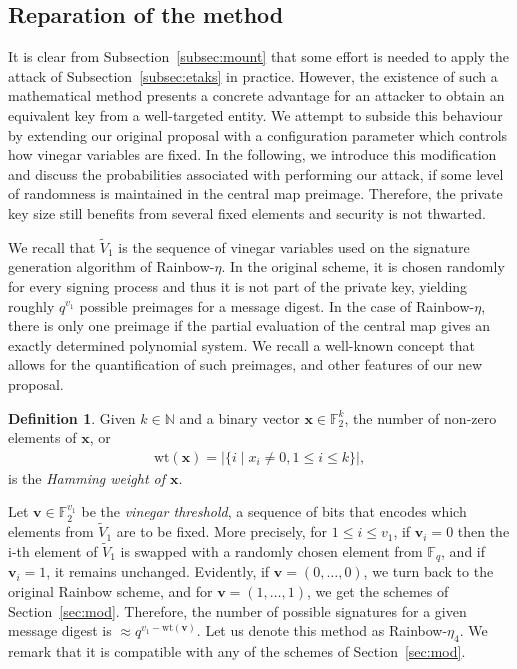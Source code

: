 \documentclass[12pt, a4paper, oneside]{memoir}
\theoremstyle{definition}
\newtheorem{definition}[theorem]{Definition}
\begin{document}
\subsection{Reparation of the method}\label{subsec:repair}

It is clear from Subsection~\ref{subsec:mount} that some effort is needed to apply the attack of Subsection~\ref{subsec:etaks} in practice. However, the existence of such a mathematical method presents a concrete advantage for an attacker to obtain an equivalent key from a well-targeted entity. We attempt to subside this behaviour by extending our original proposal with a configuration parameter which controls how vinegar variables are fixed. In the following, we introduce this modification and discuss the probabilities associated with performing our attack, if some level of randomness is maintained in the central map preimage. Therefore, the private key size still benefits from several fixed elements and security is not thwarted.

We recall that $\widetilde{V}_{1}$ is the sequence of vinegar variables used on the signature generation algorithm of Rainbow-$\eta$. In the original scheme, it is chosen randomly for every signing process and thus it is not part of the private key, yielding roughly $q^{v_{1}}$ possible preimages for a message digest. In the case of Rainbow-$\eta$, there is only one preimage if the partial evaluation of the central map gives an exactly determined polynomial system. We recall a well-known concept that allows for the quantification of such preimages, and other features of our new proposal.

\begin{definition}
  Given $k \in \mathbb{N}$ and a binary vector $\mathbf{x} \in \mathbb{F}_{2}^{k}$, the number of non-zero elements of $\mathbf{x}$, or
  \begin{align}
    \text{wt}(\mathbf{x}) = |\{ i \mid x_{i} \neq 0, 1 \leq i \leq k \}|,
  \end{align}
  is the \emph{Hamming weight of $\mathbf{x}$}.
\end{definition}

Let $\mathbf{v} \in \mathbb{F}_{2}^{v_{1}}$ be the \emph{vinegar threshold}, a sequence of bits that encodes which elements from $\widetilde{V}_{1}$ are to be fixed. More precisely, for $1 \leq i \leq v_{1}$, if $\mathbf{v}_{i} = 0$ then the i-th element of $\widetilde{V}_{1}$ is swapped with a randomly chosen element from $\mathbb{F}_{q}$, and if $\mathbf{v}_{i} = 1$, it remains unchanged. Evidently, if $\mathbf{v} = (0, \dots, 0)$, we turn back to the original Rainbow scheme, and for $\mathbf{v} = (1, \dots, 1)$, we get the schemes of Section~\ref{sec:mod}. Therefore, the number of possible signatures for a given message digest is $\approx q^{v_{1} - \text{wt}(\mathbf{v})}$. Let us denote this method as Rainbow-$\eta_{4}$. We remark that it is compatible with any of the schemes of Section~\ref{sec:mod}.
\end{document}
